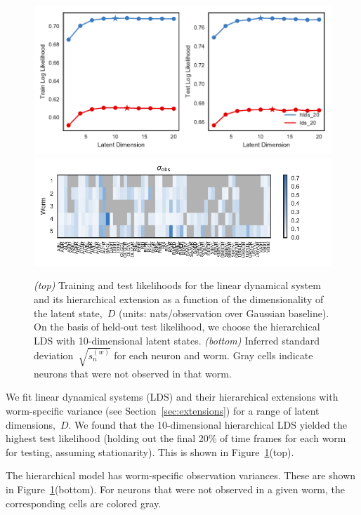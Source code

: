 \documentclass{article}
\begin{document}
\begin{figure}[h]
  \centering
  \includegraphics[width=6in]{figures/lds/dimensionality} \\
  \includegraphics[width=5.5in]{figures/lds/observation_variance} 
  \caption{\textit{(top)} Training and test likelihoods for the linear
    dynamical system and its hierarchical extension as a function of
    the dimensionality of the latent state,~$D$ (units:
    nats/observation over Gaussian baseline). On the basis of held-out
    test likelihood, we choose the hierarchical LDS with
    10-dimensional latent states.  \textit{(bottom)} Inferred standard
    deviation~$\sqrt{s_n^{(w)}}$ for each neuron and worm.  Gray cells
    indicate neurons that were not observed in that worm.}
  \label{fig:lds}
\end{figure}

We fit linear dynamical systems (LDS) and their hierarchical
extensions with worm-specific variance (see Section~\ref{sec:extensions})
for a range of latent dimensions,~$D$.  We found that the
10-dimensional hierarchical LDS yielded the highest test
likelihood (holding out the final 20\% of time frames for
each worm for testing, assuming stationarity). This is
shown in Figure~\ref{fig:lds}(top).

The hierarchical model has worm-specific observation variances.
These are shown in Figure~\ref{fig:lds}(bottom).  For neurons that
were not observed in a given worm, the corresponding cells are
colored gray. 
\end{document}
